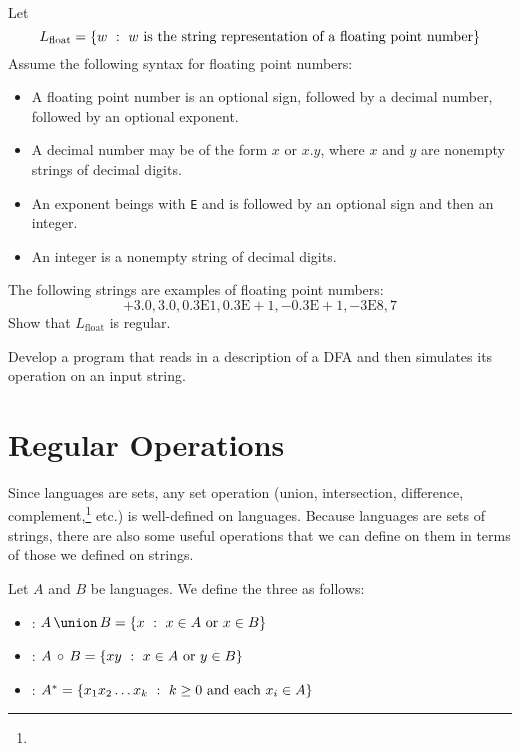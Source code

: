 \documentclass[twoside,letterpaper,openany]{book}
\begin{document}
\begin{exer}\label{exer:floatingpoint}
~\\Let 
\[L_{\mathrm{float}} = \left\lbrace w\ :\ w~\textrm{is the string representation of a floating point number} \right\rbrace\]
Assume the following syntax for floating point numbers:
\begin{itemize}
\item A floating point number is an optional sign, followed by a decimal number, followed by an optional exponent.
\item A decimal number may be of the form $x$ or $x.y$, where $x$ and $y$ are nonempty strings of decimal digits.
\item An exponent beings with \texttt{E} and is followed by an optional sign and then an integer.
\item An integer is a nonempty string of decimal digits.
\end{itemize}
The following strings are examples of floating point numbers:
\[\mathrm{+3.0, 3.0, 0.3E1, 0.3E+1, -0.3E+1, -3E8, 7}\]
Show that $L_{\mathrm{float}}$ is regular.
\end{exer}


\begin{progexer}\happymac
Develop a program that reads in a description of a DFA and then simulates its operation on an input string.
\end{progexer}


\clearpage
\section{Regular Operations}

\begin{discussion}
Since languages are sets, any set operation (union, intersection, difference, complement,\footnote{} etc.) is well-defined on languages. Because languages are sets of strings, there are also some useful operations that we can define on them in terms of those we defined on strings.
\end{discussion}

\begin{defn}\label{def:regops}
Let $A$ and $B$ be languages. We define the three  as follows:
\begin{itemize}
\item {}: $\setunion A B = \setbuild{x}{x \in A~\textrm{or}~x \in B}$
\item {}: $A\,\circ\,B = \left\lbrace xy\ :\ x \in A~\textrm{or}~y \in B \right\rbrace$
\item {}: $A^{*} = \left\lbrace x_1 x_2 \ldots x_k\ :\ k \geq 0 ~\textrm{and each}~x_i \in A \right\rbrace$
\end{itemize}
\end{defn}
\end{document}
